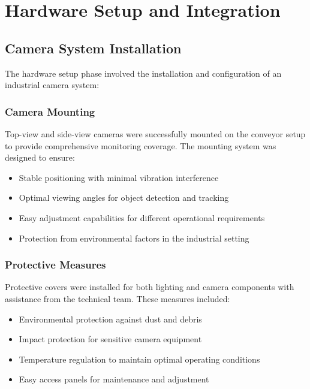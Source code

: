 \documentclass{book}
\begin{document}
\section{Hardware Setup and Integration}

\subsection{Camera System Installation}
\par\noindent The hardware setup phase involved the installation and configuration of an industrial camera system:

\subsubsection{Camera Mounting}
\par\noindent Top-view and side-view cameras were successfully mounted on the conveyor setup to provide comprehensive monitoring coverage. The mounting system was designed to ensure:

\begin{itemize}
\item Stable positioning with minimal vibration interference
\item Optimal viewing angles for object detection and tracking
\item Easy adjustment capabilities for different operational requirements
\item Protection from environmental factors in the industrial setting
\end{itemize}

\subsubsection{Protective Measures}
\par\noindent Protective covers were installed for both lighting and camera components with assistance from the technical team. These measures included:

\begin{itemize}
\item Environmental protection against dust and debris
\item Impact protection for sensitive camera equipment
\item Temperature regulation to maintain optimal operating conditions
\item Easy access panels for maintenance and adjustment
\end{itemize}
\end{document}
